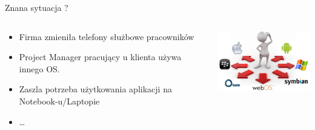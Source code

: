 \documentclass{beamer}
\begin{document}
\begin{frame}{Znana sytuacja ?}
     \begin{columns}[T] %
     
          \begin{column}[T]{7cm} %
	\begin{itemize}
    \item<1-> Firma zmieniła telefony służbowe pracowników
    \item<2-> Project Manager pracujący u klienta używa innego OS.
    \item<3-> Zaszla potrzeba użytkowania aplikacji na Notebook-u/Laptopie
    \item<4-> \dots
    \end{itemize}
     \end{column}
      \begin{column}[T]{5cm} %
          \includegraphics[width=5cm]{mobile.png}
     \end{column}
     \end{columns}
\end{frame}
\end{document}
